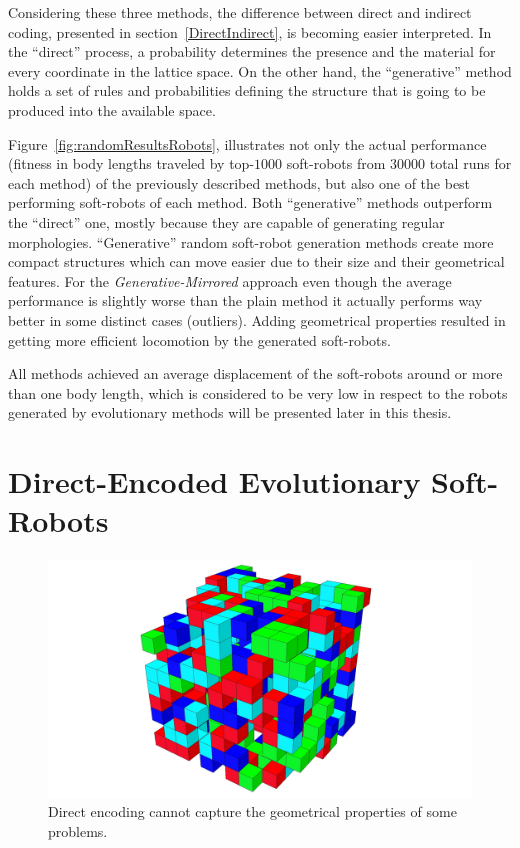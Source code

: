 Considering these three methods, the difference between direct and indirect coding, presented in section~\ref{DirectIndirect}, is becoming easier interpreted. In the ``direct'' process, a probability determines the presence and the material for every coordinate in the lattice space. On the other hand, the ``generative'' method holds a set of rules and probabilities defining the structure that is going to be produced into the available space.

Figure~\ref{fig:randomResultsRobots}, illustrates not only the actual performance (fitness in body lengths traveled by top-$1000$ soft-robots from $30000$ total runs for each method) of the previously described methods, but also one of the best performing soft-robots of each method. Both ``generative'' methods outperform the ``direct'' one, mostly because they are capable of generating regular morphologies. ``Generative'' random soft-robot generation methods create more compact structures which can move easier due to their size and their geometrical features. For the \textit{Generative-Mirrored} approach even though the average performance is slightly worse than the plain method it actually performs way better in some distinct cases (outliers). Adding geometrical properties resulted in getting more efficient locomotion by the generated soft-robots.

All methods achieved an average displacement of the soft-robots around or more than one body length, which is considered to be very low in respect to the robots generated by evolutionary methods will be presented later in this thesis.

\section{Direct-Encoded Evolutionary Soft-Robots}
\label{DirectEncodingEvolution}

\begin{figure}
\centering
\includegraphics[height=0.2\textheight]{../Figures/Robots/direct.jpg}
\caption{Direct encoding cannot capture the geometrical properties of some problems.}
\label{fig:directRobot}
\end{figure}

